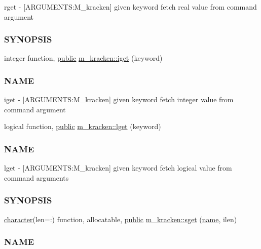 \begin{DoxyCompactItemize}
\begin{DoxyCompactList}
rget -\/ \mbox{[}A\+R\+G\+U\+M\+E\+N\+TS\+:M\+\_\+kracken\mbox{]} given keyword fetch real value from command argument \subsubsection*{S\+Y\+N\+O\+P\+S\+IS}\end{DoxyCompactList}\item 
integer function, \hyperlink{M__stopwatch_83_8txt_a2f74811300c361e53b430611a7d1769f}{public} \hyperlink{namespacem__kracken_a420718890eac378e5cd047dd0b477424}{m\+\_\+kracken\+::iget} (keyword)
\begin{DoxyCompactList}\small\item\em \subsubsection*{N\+A\+ME}

iget -\/ \mbox{[}A\+R\+G\+U\+M\+E\+N\+TS\+:M\+\_\+kracken\mbox{]} given keyword fetch integer value from command argument \end{DoxyCompactList}\item 
logical function, \hyperlink{M__stopwatch_83_8txt_a2f74811300c361e53b430611a7d1769f}{public} \hyperlink{namespacem__kracken_a7141acd7a00c1a5aa5f90612a0414b63}{m\+\_\+kracken\+::lget} (keyword)
\begin{DoxyCompactList}\small\item\em \subsubsection*{N\+A\+ME}

lget -\/ \mbox{[}A\+R\+G\+U\+M\+E\+N\+TS\+:M\+\_\+kracken\mbox{]} given keyword fetch logical value from command arguments \subsubsection*{S\+Y\+N\+O\+P\+S\+IS}\end{DoxyCompactList}\item 
\hyperlink{option__stopwatch_83_8txt_abd4b21fbbd175834027b5224bfe97e66}{character}(len=\+:) function, allocatable, \hyperlink{M__stopwatch_83_8txt_a2f74811300c361e53b430611a7d1769f}{public} \hyperlink{namespacem__kracken_a9a64192326816b0b9badcc11506628ee}{m\+\_\+kracken\+::sget} (\hyperlink{M__stopwatch_83_8txt_a3f508a893ae4c3b397b4383e33b9bcae}{name}, ilen)
\begin{DoxyCompactList}\small\item\em \subsubsection*{N\+A\+ME}


\end{DoxyCompactList}
\end{DoxyCompactItemize}
